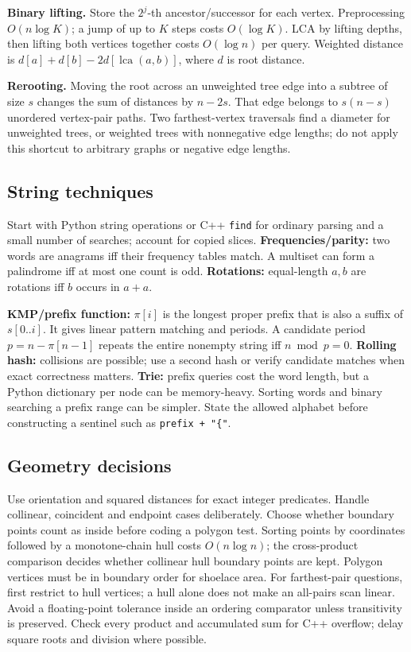 \textbf{Binary lifting.} Store the $2^j$-th ancestor/successor for each
vertex. Preprocessing $O(n\log K)$; a jump of up to $K$ steps costs
$O(\log K)$. LCA by lifting depths, then lifting both vertices together
costs $O(\log n)$ per query. Weighted distance is
$d[a]+d[b]-2d[\operatorname{lca}(a,b)]$, where $d$ is root distance.

\textbf{Rerooting.} Moving the root across an unweighted tree edge into
a subtree of size $s$ changes the sum of distances by $n-2s$.
That edge belongs to $s(n-s)$ unordered vertex-pair paths.
Two farthest-vertex traversals find a diameter for unweighted trees,
or weighted trees with nonnegative edge lengths; do not apply this
shortcut to arbitrary graphs or negative edge lengths.

\subsection{String techniques}\label{algo:strings}
Start with Python string operations or C++ \texttt{find} for ordinary
parsing and a small number of searches; account for copied slices.
\textbf{Frequencies/parity:} two words are anagrams iff their frequency
tables match. A multiset can form a palindrome iff at most one count is odd.
\textbf{Rotations:} equal-length $a,b$ are rotations iff $b$ occurs in $a+a$.

\textbf{KMP/prefix function:} $\pi[i]$ is the longest proper prefix that
is also a suffix of $s[0..i]$. It gives linear pattern matching and periods.
A candidate period $p=n-\pi[n-1]$ repeats the entire nonempty string iff
$n\bmod p=0$. \textbf{Rolling hash:} collisions are possible; use a second
hash or verify candidate matches when exact correctness matters.
\textbf{Trie:} prefix queries cost the word length, but a Python dictionary
per node can be memory-heavy. Sorting words and binary searching a prefix
range can be simpler. State the allowed alphabet before constructing a
sentinel such as \texttt{prefix + "\{"}.

\subsection{Geometry decisions}\label{algo:geometry}
Use orientation and squared distances for exact integer predicates.
Handle collinear, coincident and endpoint cases deliberately.
Choose whether boundary points count as inside before coding a polygon test.
Sorting points by coordinates followed by a monotone-chain hull costs
$O(n\log n)$; the cross-product comparison decides whether collinear hull
boundary points are kept. Polygon vertices must be in boundary order for
shoelace area. For farthest-pair questions, first restrict to hull vertices;
a hull alone does not make an all-pairs scan linear.
Avoid a floating-point tolerance inside an ordering comparator unless
transitivity is preserved. Check every product and accumulated sum for
C++ overflow; delay square roots and division where possible.

